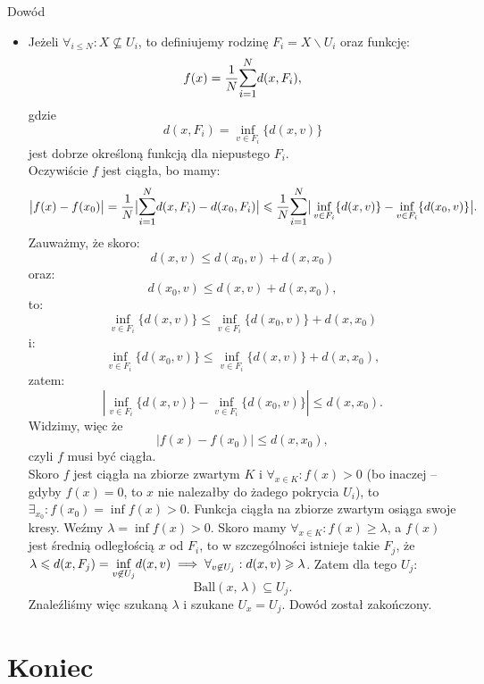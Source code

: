 \documentclass{article}
\newcounter{defi}
\numberwithin{defi}{section}
\numberwithin{defi}{section}
\newcommand{\se}{\subseteq}
\renewcommand{\geq}{\geqslant}
\renewcommand{\leq}{\leqslant}
\newcommand{\bsum}[2]{\mathlarger{\sum_{#1}^{#2}}}
\newcommand{\ball}[2]{\text{Ball}(#1, \, #2)}
\begin{document}
\begin{dow}{Dowód}
\begin{itemize}
        
        \item Jeżeli $\forall_{i \leq N}: X \not \se U_i$, to definiujemy rodzinę $F_i = X \backslash U_i$ oraz funkcję: \begin{equation*}
            f(x) = \frac{1}{N} \bsum{i = 1}{N}d(x, F_i),
        \end{equation*} gdzie \begin{equation*}
            d(x, F_i) = \inf_{v \in F_i}\{d(x, v)\}
        \end{equation*} jest dobrze określoną funkcją dla niepustego $F_i$.\\
        Oczywiście $f$ jest ciągła, bo mamy: \begin{equation*}
            \big| f(x) - f(x_0)\big| = \frac{1}{N} \big|\bsum{i = 1}{N} d(x, F_i) - d(x_0, F_i) \big| \leq \frac{1}{N} \bsum{i = 1}{N} \big| \inf_{v \in F_i}\{d(x, v)\} - \inf_{v \in F_i}\{d(x_0, v) \}\big|.
        \end{equation*} Zauważmy, że skoro: \begin{equation*}
            d(x, v)  \leq d(x_0, v) + d(x, x_0) 
        \end{equation*} oraz: \begin{equation*}
            d(x_0, v) \leq d(x, v) + d(x, x_0),
        \end{equation*} to: \begin{equation*}
            \inf_{v \in F_i}\{d(x, v)\} \leq \inf_{v \in F_i}\{d(x_0, v) \} + d(x, x_0)
        \end{equation*} i: \begin{equation*}
            \inf_{v \in F_i}\{d(x_0, v)\} \leq \inf_{v \in F_i}\{d(x, v) \} + d(x, x_0),
        \end{equation*} zatem: \begin{equation*}
            |\inf_{v \in F_i}\{d(x, v)\} - \inf_{v \in F_i}\{d(x_0, v) \}| \leq d(x, x_0).
        \end{equation*} Widzimy, więc że \begin{equation*}
            |f(x) - f(x_0)| \leq d(x, x_0),
        \end{equation*} czyli $f$ musi być ciągła. \\
        Skoro $f$ jest ciągła na zbiorze zwartym $K$ i $\forall_{x \in K}: f(x) > 0$ (bo inaczej -- gdyby $f(x) = 0$, to $x$ nie nalezałby do żadego pokrycia $U_i$), to $\exists_{x_0}: f(x_0) = \inf f(x) >0$. Funkcja ciągła na zbiorze zwartym osiąga swoje kresy. Weźmy $\lambda = \inf f(x) > 0$. Skoro mamy $\forall_{x \in K}: f(x) \geq \lambda$, a $f(x)$ jest średnią odległością $x$ od $F_i$, to w szczególności istnieje takie $F_j$, że $\lambda \leq d(x, F_j) = \mathlarger{\inf}_{v \not \in U_j}d(x, v)  \implies \forall_{v \not \in U_j}: d(x, v) \geq \lambda$.  Zatem dla tego $U_j$:\begin{equation*}
            \ball{x}{\lambda} \se U_j.
        \end{equation*} Znaleźliśmy więc szukaną $\lambda$ i szukane $U_x = U_j$. Dowód został zakończony.
    \end{itemize}
\end{dow}





\section*{Koniec}
\newpage
\tableofcontents
\end{document}
